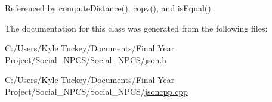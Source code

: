 Referenced by compute\+Distance(), copy(), and is\+Equal().



The documentation for this class was generated from the following files\+:\begin{DoxyCompactItemize}
\item 
C\+:/\+Users/\+Kyle Tuckey/\+Documents/\+Final Year Project/\+Social\+\_\+\+N\+P\+C\+S/\+Social\+\_\+\+N\+P\+C\+S/\hyperlink{json_8h}{json.\+h}\item 
C\+:/\+Users/\+Kyle Tuckey/\+Documents/\+Final Year Project/\+Social\+\_\+\+N\+P\+C\+S/\+Social\+\_\+\+N\+P\+C\+S/\hyperlink{jsoncpp_8cpp}{jsoncpp.\+cpp}\end{DoxyCompactItemize}
